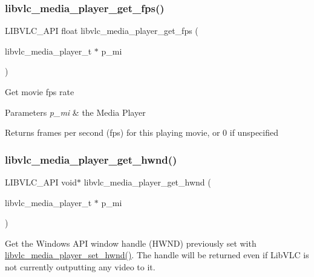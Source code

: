 \subsubsection{\texorpdfstring{libvlc\+\_\+media\+\_\+player\+\_\+get\+\_\+fps()}{libvlc\_media\_player\_get\_fps()}}
{\footnotesize\ttfamily L\+I\+B\+V\+L\+C\+\_\+\+A\+PI float libvlc\+\_\+media\+\_\+player\+\_\+get\+\_\+fps (\begin{DoxyParamCaption}\item[{libvlc\+\_\+media\+\_\+player\+\_\+t $\ast$}]{p\+\_\+mi }\end{DoxyParamCaption})}

Get movie fps rate


\begin{DoxyParams}{Parameters}
{\em p\+\_\+mi} & the Media Player \\
\hline
\end{DoxyParams}
\begin{DoxyReturn}{Returns}
frames per second (fps) for this playing movie, or 0 if unspecified 
\end{DoxyReturn}
\mbox{\label{group__libvlc__media__player_ga9543ef07c220ccaf6250c2c3022efb46}} 
\subsubsection{\texorpdfstring{libvlc\+\_\+media\+\_\+player\+\_\+get\+\_\+hwnd()}{libvlc\_media\_player\_get\_hwnd()}}
{\footnotesize\ttfamily L\+I\+B\+V\+L\+C\+\_\+\+A\+PI void$\ast$ libvlc\+\_\+media\+\_\+player\+\_\+get\+\_\+hwnd (\begin{DoxyParamCaption}\item[{libvlc\+\_\+media\+\_\+player\+\_\+t $\ast$}]{p\+\_\+mi }\end{DoxyParamCaption})}

Get the Windows A\+PI window handle (H\+W\+ND) previously set with \hyperlink{group__libvlc__media__player_ga0ee3abb85cd9735fdeace4882eb711f3}{libvlc\+\_\+media\+\_\+player\+\_\+set\+\_\+hwnd()}. The handle will be returned even if Lib\+V\+LC is not currently outputting any video to it.


